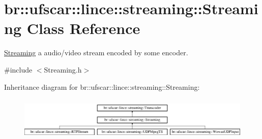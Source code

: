 \hypertarget{classbr_1_1ufscar_1_1lince_1_1streaming_1_1Streaming}{
\section{br::ufscar::lince::streaming::Streaming Class Reference}
\label{classbr_1_1ufscar_1_1lince_1_1streaming_1_1Streaming}
}


\hyperlink{classbr_1_1ufscar_1_1lince_1_1streaming_1_1Streaming}{Streaming} a audio/video stream encoded by some encoder.  




{\ttfamily \#include $<$Streaming.h$>$}

Inheritance diagram for br::ufscar::lince::streaming::Streaming:\begin{figure}[H]
\begin{center}
\leavevmode
\includegraphics[height=2.11321cm]{classbr_1_1ufscar_1_1lince_1_1streaming_1_1Streaming}
\end{center}
\end{figure}

